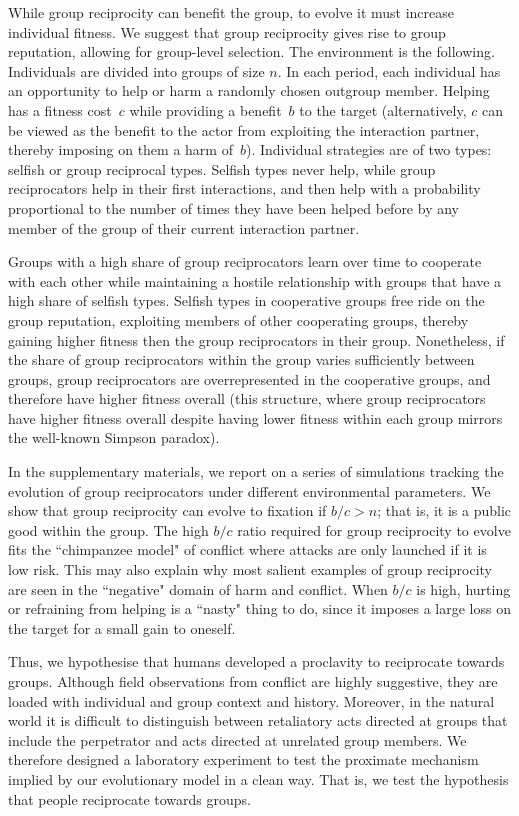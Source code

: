 \documentclass[12pt,a4paper]{article}\usepackage[]{graphicx}\usepackage[]{color}
\begin{document}
While group reciprocity can benefit the group, to evolve it must increase individual fitness. We suggest that group reciprocity gives rise to group reputation, allowing for group-level selection. The environment is the following. 
Individuals are divided into groups of size $n$. In each period, each individual has an opportunity to help or harm a randomly chosen outgroup member. Helping has a fitness cost~$c$ while providing a benefit~$b$ to the target (alternatively, $c$ can be viewed as the benefit to the actor from exploiting the interaction partner, thereby imposing on them a harm of~$b$). 
Individual strategies are of two types: selfish or group reciprocal types.
Selfish types never help, while group reciprocators help in their first interactions, and then help with a probability proportional to the number of times they have been helped before by any member of the group of their current interaction partner. 

Groups with a high share of group reciprocators learn over time to cooperate with each other while maintaining a hostile relationship with groups that have a high share of selfish types. Selfish types in cooperative groups free ride on the group reputation, exploiting members of other cooperating groups, thereby gaining higher fitness then the group reciprocators in their group. Nonetheless, if the share of group reciprocators within the group varies sufficiently between groups, group reciprocators are overrepresented in the cooperative groups, and therefore have higher fitness overall (this structure, where group reciprocators have higher fitness overall despite having lower fitness within each group mirrors the well-known Simpson paradox).

In the supplementary materials, we report on a series of simulations tracking the evolution of group reciprocators under different environmental parameters. We show that group reciprocity can evolve to fixation if $b/c > n$; that is, it is a public good within the group. The high $b/c$ ratio required for group reciprocity to evolve fits the ``chimpanzee model" of conflict where attacks are only launched if it is low risk. This may also explain why most salient examples of group reciprocity are seen in the ``negative" domain of harm and conflict. When $b/c$ is high, hurting or refraining from helping is a ``nasty" thing to do, since it imposes a large loss on the target for a small gain to oneself.

Thus, we hypothesise that humans developed a proclavity to reciprocate towards groups. Although field observations from conflict are highly suggestive, they are loaded with individual and group context and history. Moreover, in the natural world it is difficult to distinguish between retaliatory acts directed at groups that include the perpetrator and acts directed at unrelated group members.  %
We therefore designed a laboratory experiment to test the proximate mechanism implied by our evolutionary model in a clean way. That is, we test the hypothesis that people reciprocate towards groups. 
\end{document}

